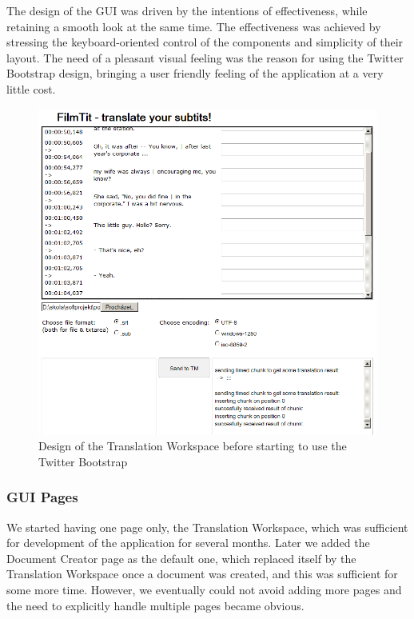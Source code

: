 The design of the GUI was driven by the intentions of effectiveness, while retaining a smooth look at the same time. The effectiveness was achieved by stressing the keyboard-oriented control of the components and simplicity of their layout. The need of a pleasant visual feeling was the reason for using the Twitter Bootstrap design, bringing a user friendly feeling of the application at a very little cost.

\begin{figure}
\begin{center}
\includegraphics[scale=0.5]{figures/old_screenshot.png}
\end{center}
\caption{Design of the Translation Workspace before starting to use the Twitter Bootstrap}
\label{fig:before_bootstrap}
\end{figure}

\subsubsection{GUI Pages}

We started having one page only, the Translation Workspace, which was sufficient for development of the application for several months. Later we added the Document  Creator page as the default one, which replaced itself by the Translation Workspace once a document was created, and this was sufficient for some more time. However, we eventually could not avoid adding more pages and the need to explicitly handle multiple pages became obvious.

